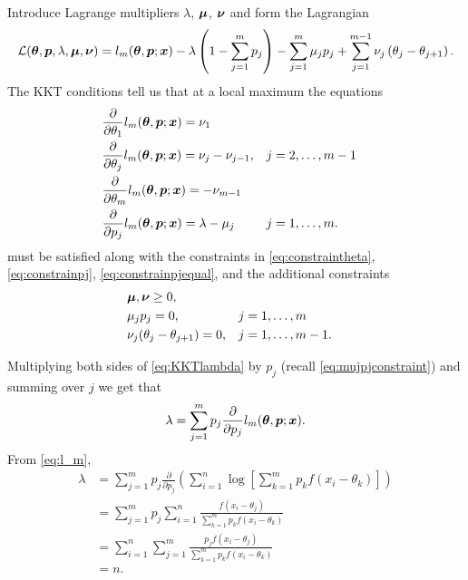 	Introduce Lagrange multipliers $\lambda$, ${\bm{{\mu}}}$, ${\bm{{\nu}}}$ and form the Lagrangian
	\begin{equation}
		\mathcal{L}({\bm{{\theta}}},{\bm{{p}}},\lambda,{\bm{{\mu}}},{\bm{{\nu}}}) = l_m({\bm{{\theta}}},{\bm{{p}}};{\bm{{x}}}) - \lambda\left(1 - \sum_{j=1}^m p_j\right) - \sum_{j=1}^m \mu_j p_j + \sum_{j=1}^{m-1} \nu_j \left(\theta_j - \theta_{j+1}\right).
		\label{eq:kkt lagrangian}
	\end{equation}
	The KKT conditions tell us that at a local maximum the equations
	\begin{align}
		&\frac{\partial}{\partial \theta_1} l_m({\bm{{\theta}}},{\bm{{p}}};{\bm{{x}}}) = \nu_1 \label{eq:KKTtheta1}\\ 
		&\frac{\partial}{\partial \theta_j} l_m({\bm{{\theta}}},{\bm{{p}}};{\bm{{x}}}) = \nu_j - \nu_{j-1}, &&j=2,\dots,m-1 \label{eq:KKTtheta}\\ 
		&\frac{\partial}{\partial \theta_m} l_m({\bm{{\theta}}},{\bm{{p}}};{\bm{{x}}}) = -\nu_{m-1} \label{eq:KKTthetam}\\ 
		&\frac{\partial}{\partial p_j} l_m({\bm{{\theta}}},{\bm{{p}}};{\bm{{x}}}) = \lambda - \mu_j && j = 1,\dots,m. \label{eq:KKTlambda}
	\end{align}
	must be satisfied along with the constraints in \eqref{eq:constraintheta}, \eqref{eq:constrainpj}, \eqref{eq:constrainpjequal}, and the additional constraints
	\begin{align}
		&{\bm{{\mu}}},{\bm{{\nu}}} \geq 0,\\
		&\mu_j p_j = 0, &&j=1,\dots,m \label{eq:mujpjconstraint}\\
		&\nu_j (\theta_j - \theta_{j+1}) = 0, &&j=1,\dots,m-1.
		\label{eq:nujthetajconstraint}
	\end{align}

	Multiplying both sides of \eqref{eq:KKTlambda} by $p_j$ (recall \eqref{eq:mujpjconstraint}) and summing over $j$ we get that
	\begin{equation}
		\lambda = \sum_{j = 1}^m p_j \frac{\partial}{\partial p_j} l_m({\bm{{\theta}}},{\bm{{p}}};{\bm{{x}}}).
	\end{equation}
	From \eqref{eq:l_m},
	\begin{align}
		\lambda &= \sum_{j = 1}^m p_j \frac{\partial}{\partial p_j} \left( \sum_{i=1}^n \log \left[\sum_{k=1}^m p_k f(x_i - \theta_k) \right] \right)\\
			&= \sum_{j = 1}^m p_j \sum_{i=1}^n \frac{f(x_i - \theta_j)}{\sum_{k=1}^m p_k f(x_i - \theta_k)}\\
			&= \sum_{i=1}^n \sum_{j=1}^m  \frac{p_j f(x_i - \theta_j)}{\sum_{k=1}^m p_k f(x_i - \theta_k)}\\
			&= n.
	\end{align}

